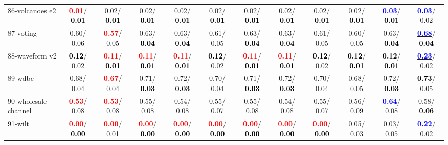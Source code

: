 \begin{table}[h]
\begin{center}
{\begin{tabular}{lc|c|c|c|c|c|c|c|c|c|c}
86-volcanoes e2 & \textcolor{red}{\textbf{  0.01}}/\textcolor{black}{\textbf{  0.01}} &   0.02/\textcolor{black}{\textbf{  0.01}} &   0.02/\textcolor{black}{\textbf{  0.01}} &   0.02/\textcolor{black}{\textbf{  0.01}} &   0.02/\textcolor{black}{\textbf{  0.01}} &   0.02/\textcolor{black}{\textbf{  0.01}} &   0.02/\textcolor{black}{\textbf{  0.01}} &   0.02/\textcolor{black}{\textbf{  0.01}} &   0.02/\textcolor{black}{\textbf{  0.01}} & \textcolor{blue}{\textbf{  0.03}}/\textcolor{black}{\textbf{  0.01}} & \textcolor{blue}{\textbf{  0.03}}/  0.02 \\
87-voting &   0.60/  0.06 & \textcolor{red}{\textbf{  0.57}}/  0.05 &   0.63/\textcolor{black}{\textbf{  0.04}} &   0.63/\textcolor{black}{\textbf{  0.04}} &   0.61/  0.05 &   0.63/\textcolor{black}{\textbf{  0.04}} &   0.63/\textcolor{black}{\textbf{  0.04}} &   0.61/  0.05 &   0.60/  0.05 &   0.63/\textcolor{black}{\textbf{  0.04}} & \underline{\textcolor{blue}{\textbf{  0.68}}}/\textcolor{black}{\textbf{  0.04}} \\
88-waveform v2 & \textcolor{black}{\textbf{  0.12}}/  0.02 & \textcolor{red}{\textbf{  0.11}}/\textcolor{black}{\textbf{  0.01}} & \textcolor{red}{\textbf{  0.11}}/\textcolor{black}{\textbf{  0.01}} & \textcolor{red}{\textbf{  0.11}}/\textcolor{black}{\textbf{  0.01}} & \textcolor{black}{\textbf{  0.12}}/  0.02 & \textcolor{red}{\textbf{  0.11}}/\textcolor{black}{\textbf{  0.01}} & \textcolor{red}{\textbf{  0.11}}/\textcolor{black}{\textbf{  0.01}} & \textcolor{black}{\textbf{  0.12}}/  0.02 & \textcolor{black}{\textbf{  0.12}}/\textcolor{black}{\textbf{  0.01}} & \textcolor{black}{\textbf{  0.12}}/\textcolor{black}{\textbf{  0.01}} & \underline{\textcolor{blue}{\textbf{  0.23}}}/  0.02 \\
89-wdbc &   0.68/  0.04 & \textcolor{red}{\textbf{  0.67}}/  0.04 &   0.71/\textcolor{black}{\textbf{  0.03}} &   0.72/\textcolor{black}{\textbf{  0.03}} &   0.70/  0.04 &   0.71/\textcolor{black}{\textbf{  0.03}} &   0.72/\textcolor{black}{\textbf{  0.03}} &   0.70/  0.04 &   0.68/  0.05 &   0.72/\textcolor{black}{\textbf{  0.03}} & \textcolor{black}{\textbf{  0.73}}/  0.05 \\
90-wholesale channel & \textcolor{red}{\textbf{  0.53}}/  0.08 & \textcolor{red}{\textbf{  0.53}}/  0.08 &   0.55/  0.08 &   0.54/  0.08 &   0.55/  0.07 &   0.55/  0.08 &   0.54/  0.08 &   0.55/  0.07 &   0.56/  0.09 & \textcolor{blue}{\textbf{  0.64}}/  0.08 &   0.58/\textcolor{black}{\textbf{  0.06}} \\
91-wilt & \textcolor{red}{\textbf{  0.00}}/\textcolor{black}{\textbf{  0.00}} & \textcolor{red}{\textbf{  0.00}}/  0.01 & \textcolor{red}{\textbf{  0.00}}/\textcolor{black}{\textbf{  0.00}} & \textcolor{red}{\textbf{  0.00}}/\textcolor{black}{\textbf{  0.00}} & \textcolor{red}{\textbf{  0.00}}/\textcolor{black}{\textbf{  0.00}} & \textcolor{red}{\textbf{  0.00}}/\textcolor{black}{\textbf{  0.00}} & \textcolor{red}{\textbf{  0.00}}/\textcolor{black}{\textbf{  0.00}} & \textcolor{red}{\textbf{  0.00}}/\textcolor{black}{\textbf{  0.00}} &   0.05/  0.03 &   0.03/  0.05 & \underline{\textcolor{blue}{\textbf{  0.22}}}/  0.02 \\

\end{tabular}}
\end{center}
\end{table}
